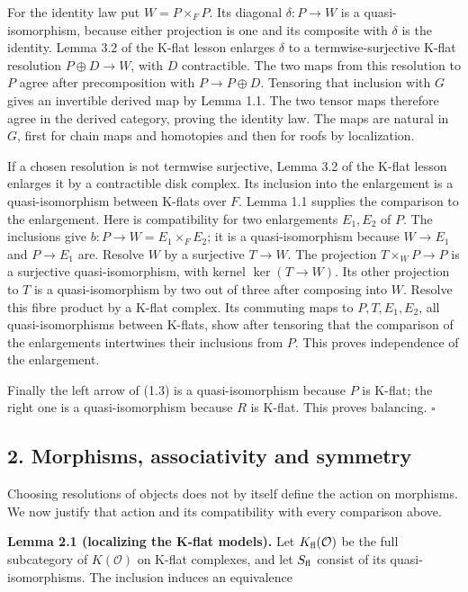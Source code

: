 \documentclass[
  english,
  11pt,
  a4paper,
]{article}
\begin{document}
For the identity law put \(W=P\times_F P\). Its diagonal
\(\delta:P\to W\) is a quasi-isomorphism, because either projection is
one and its composite with \(\delta\) is the identity. Lemma 3.2 of the
K-flat lesson enlarges \(\delta\) to a termwise-surjective K-flat
resolution \(P\oplus D\to W\), with \(D\) contractible. The two maps
from this resolution to \(P\) agree after precomposition with
\(P\to P\oplus D\). Tensoring that inclusion with \(G\) gives an
invertible derived map by Lemma 1.1. The two tensor maps therefore agree
in the derived category, proving the identity law. The maps are natural
in \(G\), first for chain maps and homotopies and then for roofs by
localization.

If a chosen resolution is not termwise surjective, Lemma 3.2 of the
K-flat lesson enlarges it by a contractible disk complex. Its inclusion
into the enlargement is a quasi-isomorphism between K-flats over \(F\).
Lemma 1.1 supplies the comparison to the enlargement. Here is
compatibility for two enlargements \(E_1,E_2\) of \(P\). The inclusions
give \(b:P\to W=E_1\times_F E_2\); it is a quasi-isomorphism because
\(W\to E_1\) and \(P\to E_1\) are. Resolve \(W\) by a surjective
\(T\to W\). The projection \(T\times_W P\to P\) is a surjective
quasi-isomorphism, with kernel \(\ker(T\to W)\). Its other projection to
\(T\) is a quasi-isomorphism by two out of three after composing into
\(W\). Resolve this fibre product by a K-flat complex. Its commuting
maps to \(P,T,E_1,E_2\), all quasi-isomorphisms between K-flats, show
after tensoring that the comparison of the enlargements intertwines
their inclusions from \(P\). This proves independence of the
enlargement.

Finally the left arrow of (1.3) is a quasi-isomorphism because \(P\) is
K-flat; the right one is a quasi-isomorphism because \(R\) is K-flat.
This proves balancing. \(\square\)

\subsection{2. Morphisms, associativity and
symmetry}\label{derived-tensor-products-and-tor-sheaves--2-morphisms-associativity-and-symmetry}

Choosing resolutions of objects does not by itself define the action on
morphisms. We now justify that action and its compatibility with every
comparison above.

\textbf{Lemma 2.1 (localizing the K-flat models).} Let
\(K_{\rm fl}(\mathcal O)\) be the full subcategory of \(K(\mathcal O)\)
on K-flat complexes, and let \(S_{\rm fl}\) consist of its
quasi-isomorphisms. The inclusion induces an equivalence
\end{document}
